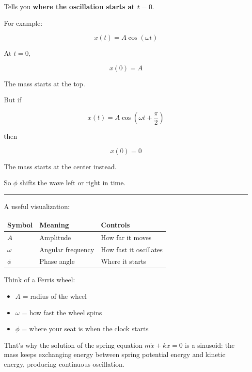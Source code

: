 \documentclass[UTF8,a4paper,11pt]{ctexart}
\begin{document}
Tells you \textbf{where the oscillation starts at $t=0$}.

For example:

\[
x(t)=A\cos(\omega t)
\]

At $t=0$,

\[
x(0)=A
\]

The mass starts at the top.

But if

\[
x(t)=A\cos\left(\omega t+\frac{\pi}{2}\right)
\]

then

\[
x(0)=0
\]

The mass starts at the center instead.

So $\phi$ shifts the wave left or right in time.

\bigskip\noindent\rule{\linewidth}{0.4pt}\bigskip

A useful visualization:

\begin{center}
\begin{tabular}{lll}
  \toprule
  Symbol & Meaning & Controls \\
  \midrule
  $A$ & Amplitude & How far it moves \\
  $\omega$ & Angular frequency & How fast it oscillates \\
  $\phi$ & Phase angle & Where it starts \\
  \bottomrule
\end{tabular}
\end{center}

Think of a Ferris wheel:

\begin{itemize}
  \item $A$ = radius of the wheel
  \item $\omega$ = how fast the wheel spins
  \item $\phi$ = where your seat is when the clock starts
\end{itemize}

That's why the solution of the spring equation $m\ddot{x}+kx=0$ is a sinusoid: the mass keeps exchanging energy between spring potential energy and kinetic energy, producing continuous oscillation.
\end{document}
